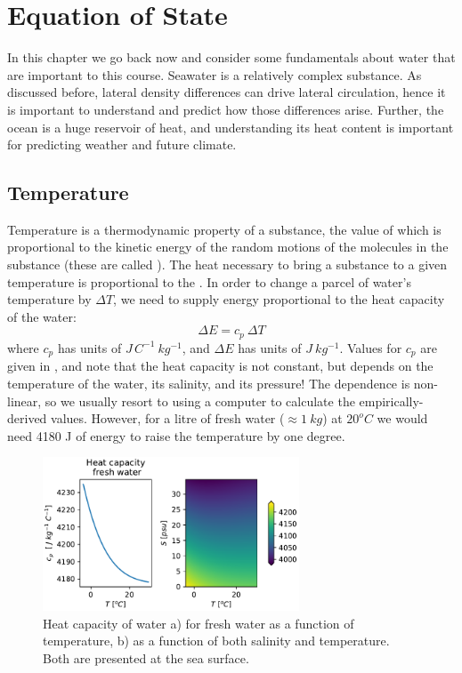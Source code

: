 
\chapter{Equation of State}
\label{chap:EquationofState}

In this chapter we go back now and consider some fundamentals about water that are important to this course.  Seawater is a relatively complex substance.  As discussed before, lateral density differences can drive lateral circulation, hence it is important to understand and predict how those differences arise.  Further, the ocean is a huge reservoir of heat, and understanding its heat content is important for predicting weather and future climate.

\section{Temperature}

Temperature is a thermodynamic property of a substance, the value of which is proportional to the kinetic energy of the random motions of the molecules in the substance (these are called ). The heat necessary to bring a substance to a given temperature is proportional to the \emph{}.  In order to change a parcel of water's temperature by $\Delta T$, we need to supply energy proportional to the heat capacity of the water:
\begin{equation}
   \Delta E = c_p\ \Delta T
\end{equation}
where $c_p$ has units of $J\, C^{-1}\ kg^{-1}$, and $\Delta E$ has units of $J\ kg^{-1}$.  Values for $c_p$ are given in , and note that the heat capacity is not constant, but depends on the temperature of the water, its salinity, and its pressure!  The dependence is non-linear, so we usually resort to using a computer to calculate the empirically-derived values.  However, for a litre of fresh water ($\approx 1\ kg$) at $20^oC$ we would need 4180 J of energy to raise the temperature by one degree.  

\begin{figure}
    \includegraphics[width=3in]{./figs/HeatCapacity.pdf}
    \caption{Heat capacity of water a) for fresh water as a function of temperature, b) as a function of both salinity and temperature.  Both are presented at the sea surface.}
    \label{fig:HeatCapacity}
\end{figure}

